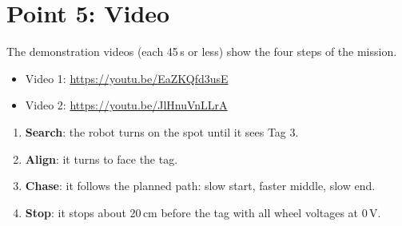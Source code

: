 \documentclass[11pt,a4paper]{article}
\begin{document}
\section{Point 5: Video}
The demonstration videos (each 45\,s or less) show the four steps of the mission.
\begin{itemize}
  \item Video 1: \url{https://youtu.be/EaZKQfd3usE}
  \item Video 2: \url{https://youtu.be/JlHnuVnLLrA}
\end{itemize}
\begin{enumerate}
  \item \textbf{Search}: the robot turns on the spot until it sees Tag 3.
  \item \textbf{Align}: it turns to face the tag.
  \item \textbf{Chase}: it follows the planned path: slow start, faster middle, slow end.
  \item \textbf{Stop}: it stops about 20\,cm before the tag with all wheel voltages at 0\,V.
\end{enumerate}
\end{document}
